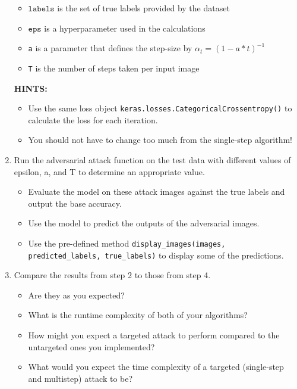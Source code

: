 \documentclass{article}
\begin{document}
\begin{enumerate}
\begin{itemize}
        \item $\texttt{labels}$ is the set of true labels provided by the dataset
        \item $\texttt{eps}$ is a hyperparameter used in the calculations
        \item \texttt{a} is a parameter that defines the step-size by $\alpha_t = (1 - a*t)^{-1}$
        \item \texttt{T} is the number of steps taken per input image
    \end{itemize}
    \textbf{HINTS:}
    \begin{itemize}
        \item Use the same loss object \texttt{keras.losses.CategoricalCrossentropy()} to calculate the loss for each iteration. 
        \item You should not have to change too much from the single-step algorithm!
    \end{itemize}
    \item Run the adversarial attack function on the test data with different values of epsilon, a, and T to determine an appropriate value.
    \begin{itemize}
        \item Evaluate the model on these attack images against the true labels and output the base accuracy. 
        \item Use the model to predict the outputs of the adversarial images.
        \item Use the pre-defined method \texttt{display\_images(images, predicted\_labels, true\_labels)} to display some of the predictions.
    \end{itemize}
    \item Compare the results from step 2 to those from step 4. 
    \begin{itemize}
        \item Are they as you expected?
        \item What is the runtime complexity of both of your algorithms?
        \item How might you expect a targeted attack to perform compared to the untargeted ones you implemented? 
        \item What would you expect the time complexity of a targeted (single-step and multistep) attack to be?
    \end{itemize}
    
\end{enumerate}
\end{document}
